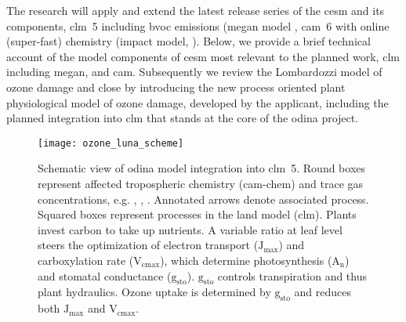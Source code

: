 The research will apply and extend the latest release series of the \gls{cesm} and its components, \gls{clm}~5 including \gls{bvoc} emissions (\gls{megan} model \parencite{ACP:Guenther2006}, \gls{cam}~6 with online (super-fast) chemistry (\gls{impact} model, \textcite{JGR:Rotman2004}). Below, we provide  a brief technical account of the model components of \gls{cesm} most relevant to the planned work, \gls{clm} including \gls{megan}, and \gls{cam}. Subsequently we review  the Lombardozzi model of ozone damage and close by introducing the new process oriented plant physiological model of ozone damage, developed by the applicant, including the planned integration into \gls{clm} that stands at the core of the \gls{odina} project.

\begin{wrapfigure}[31]{R}[0pt]{0.5\textwidth}
  \centering
  \texttt{[image: ozone\_luna\_scheme]}
  \caption{Schematic view of \gls{odina} model integration into \gls{clm}~5. Round boxes represent affected tropospheric chemistry (\gls{cam}-chem) and trace gas concentrations, e.g. \ch{[CO_2]}, \ch{[O_3]}, \ch{[H_2O]}. Annotated arrows denote associated process. Squared boxes represent processes in the land model (\gls{clm}). Plants {\color{darkgray}invest carbon} to {\color{darkgray}take up nutrients}. A variable  ratio at leaf level steers the optimization of electron transport ($\mathrm{J_{max}}$) and carboxylation rate ($\mathrm{V_{cmax}}$), which determine photosynthesis ($\mathrm{A_n}$) and stomatal conductance ($\mathrm{g_{sto}}$). $\mathrm{g_{sto}}$ controls transpiration and thus {\color{blue}plant hydraulics}. {\color{red}Ozone uptake} is determined by $\mathrm{g_{sto}}$ and reduces both $\mathrm{J_{max}}$ and $\mathrm{V_{cmax}}$.
}
  \label{fig:ozone_odina}
\end{wrapfigure}

